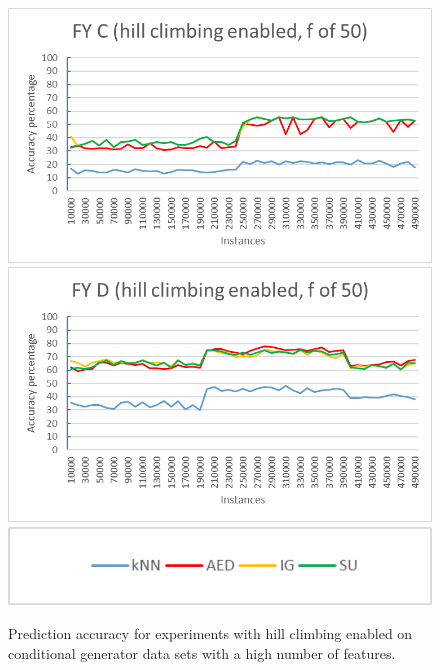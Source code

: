 \begin{figure}[h]
\begin{center}
\includegraphics[scale=0.25]{Graphs/FY_C/H_graph}
\includegraphics[scale=0.25]{Graphs/FY_D/H_graph}
\includegraphics[scale=0.5]{Graphs/legend}
\caption{Prediction accuracy for experiments with hill climbing enabled on conditional generator data sets with a high number of features.}
\label{fig:graphs2_h}
\end{center}
\end{figure}



